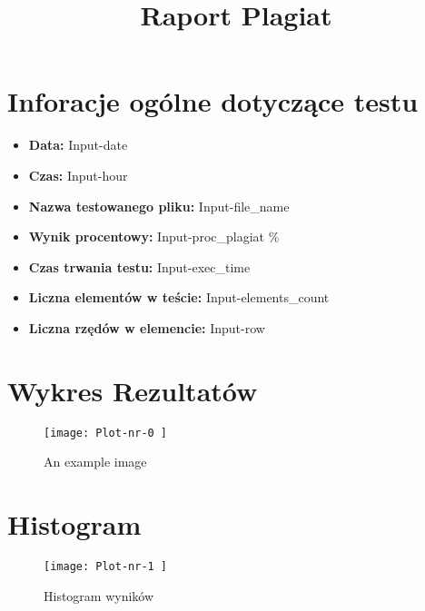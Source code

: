 \documentclass[12pt]{article}
\title{Raport Plagiat}
\date{}
\begin{document}
\maketitle



\section{Inforacje ogólne dotyczące testu}

\begin{itemize}
\item \large \textbf{Data:} Input-date

\item \textbf{Czas:} Input-hour

\item \textbf{Nazwa testowanego pliku:} Input-file_name

\item \textbf{Wynik procentowy:} Input-proc_plagiat \%

\item \textbf{Czas trwania testu:} Input-exec_time

\item \textbf{Liczna elementów w teście:} Input-elements_count

\item \textbf{Liczna rzędów w elemencie:} Input-row
\end{itemize}

\section{Wykres Rezultatów}



\begin{figure}[H]
\centering
\texttt{[image:  Plot-nr-0 ]}
\caption{An example image}
\end{figure}

\section{Histogram}

\begin{figure}[H]
\centering
\texttt{[image:  Plot-nr-1 ]}
\caption{Histogram wyników}
\end{figure}
\end{document}
